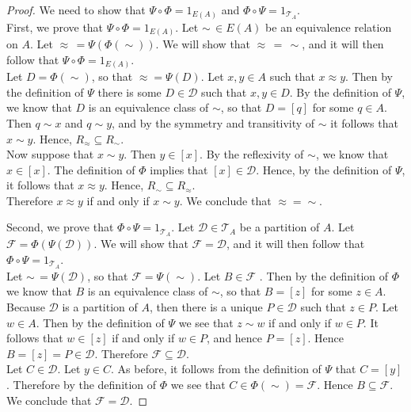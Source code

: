 \documentclass[a4paper,english,12pt]{article}
\begin{document}
\begin{proof}
	We need to show that $\Psi \circ \Phi = 1_{E(A)}$ and $\Phi \circ \Psi = 1_{\mathcal{T}_A}$.\\
	First, we prove that $\Psi \circ \Phi = 1_{E(A)}$. Let $\sim \, \in E(A)$ be an equivalence relation on $A$. Let $\approx \, = \Psi(\Phi(\sim))$. We will show that $\approx \, = \, \sim$, and it will then follow that $\Psi \circ \Phi = 1_{E(A)}$.\\
	Let $D = \Phi(\sim)$, so that $\approx  = \Psi(D)$.	Let $x,y \in A$ such that $x \approx y$. Then by the definition of $\Psi$ there is some $D \in \mathcal{D}$ such that $x,y \in D$. By the definition of $\Psi$, we know that $D$ is an equivalence class of $\sim$, so that $D = [q]$ for some $q \in A.$ Then $q \sim x$ and $q \sim y$, and by the symmetry and transitivity of $\sim$ it follows that $x \sim y$. Hence, $R_{\approx} \subseteq R_{\sim}$.\\ 
	Now suppose that $x \sim y$. Then $y \in [x]$. By the reflexivity of $\sim$, we know that $x \in [x]$. The definition of $\Phi$ implies that $[x] \in \mathcal{D}$. Hence, by the definition of $\Psi$, it follows that $x \approx y$. Hence, $R_{\sim} \subseteq R_{\approx}$.\\ 
	Therefore $x \approx y$ if and only if 	$x \sim y$. We conclude that $\approx = \sim$.
	
	Second, we prove that $\Phi \circ \Psi = 1_{\mathcal{T}_A}$. Let $\mathcal{D} \in \mathcal{T}_A$ be a partition of $A$. Let $\mathcal{F} = \Phi(\Psi(\mathcal{D}))$. We will show that $\mathcal{F} = \mathcal{D}$, and it will then follow that $\Phi \circ \Psi = 1_{\mathcal{T}_A}$. \\
	Let $\sim \, = \Psi(\mathcal{D})$, so that $\mathcal{F} = \Psi(\sim)$. Let $B \in \mathcal{F}$ . Then by the definition of $\Phi$ we know that $B$ is an equivalence class of $\sim$, so that $B = [z]$ for some $z \in A$. Because $\mathcal{D}$ is a partition of $A$, then there is a unique $P \in \mathcal{D}$ such that $z \in P$. Let $w \in A$. Then by the definition of $\Psi$ we see that $z \sim w$ if and only if $w \in P$. It follows that $w \in [z]$ if and only if $w \in P$, and hence $P = [z]$. Hence $B = [z] = P \in \mathcal{D}$. Therefore $\mathcal{F} \subseteq \mathcal{D}$.\\
	Let $C \in \mathcal{D}$. Let $y \in C$. As before, it follows from the definition of $\Psi$ that $C = [y]$. Therefore by the definition of $\Phi$ we see that $C \in \Phi(\sim) = \mathcal{F}$. Hence $B \subseteq \mathcal{F}$. We conclude that $\mathcal{F} = \mathcal{D}$.
\end{proof}
	
\end{document}
